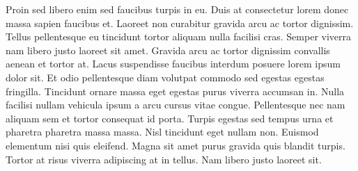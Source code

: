 \documentclass[a4paper, oneside, 10pt]{report}
\begin{document}
				Proin sed libero enim sed faucibus turpis in eu. Duis at consectetur lorem donec massa sapien faucibus et. Laoreet non curabitur gravida arcu ac tortor dignissim. Tellus pellentesque eu tincidunt tortor aliquam nulla facilisi cras. Semper viverra nam libero justo laoreet sit amet. Gravida arcu ac tortor dignissim convallis aenean et tortor at. Lacus suspendisse faucibus interdum posuere lorem ipsum dolor sit. Et odio pellentesque diam volutpat commodo sed egestas egestas fringilla. Tincidunt ornare massa eget egestas purus viverra accumsan in. Nulla facilisi nullam vehicula ipsum a arcu cursus vitae congue. Pellentesque nec nam aliquam sem et tortor consequat id porta. Turpis egestas sed tempus urna et pharetra pharetra massa massa. Nisl tincidunt eget nullam non. Euismod elementum nisi quis eleifend. Magna sit amet purus gravida quis blandit turpis. Tortor at risus viverra adipiscing at in tellus. Nam libero justo laoreet sit.





	
\end{document}
